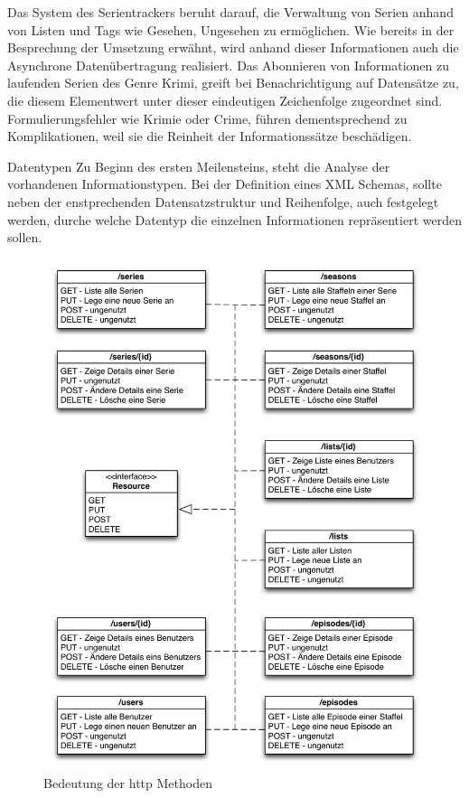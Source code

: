 \documentclass[a4paper]{article}
\begin{document}
Das System des Serientrackers beruht darauf, die Verwaltung von Serien anhand von Listen und Tags wie
Gesehen, Ungesehen zu ermöglichen. Wie bereits in der Besprechung der Umsetzung erwähnt, wird anhand
dieser Informationen auch die Asynchrone Datenübertragung realisiert.
Das Abonnieren von Informationen zu laufenden Serien des Genre Krimi, greift bei Benachrichtigung auf
Datensätze zu, die diesem Elementwert unter dieser eindeutigen Zeichenfolge zugeordnet sind. Formulierungsfehler
wie Krimie oder Crime, führen dementsprechend zu Komplikationen, weil sie die Reinheit der Informationssätze beschädigen.

Datentypen
Zu Beginn des ersten Meilensteins, steht die Analyse der vorhandenen Informationstypen.
Bei der Definition eines XML Schemas, sollte neben der enstprechenden Datensatzstruktur und Reihenfolge,
auch festgelegt werden, durche welche Datentyp die einzelnen Informationen repräsentiert werden sollen.

\newpage

\begin{figure}[H]
\includegraphics[width=1\textwidth]{images/bedeutunghttpmethoden.png}
\caption{Bedeutung der http Methoden}
\label{bedeutunghttpmethoden}
\end{figure}

\newpage



\listoffigures
\end{document}
